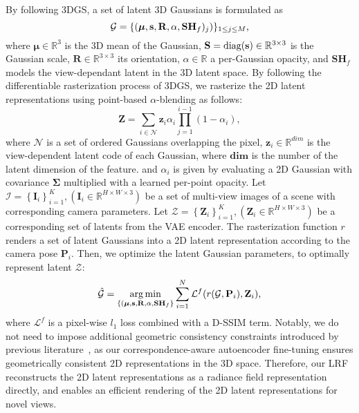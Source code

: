 By following 3DGS, a set of latent 3D Gaussians is formulated as
\begin{equation}
    \mathcal{G} = \{(\bm{\mu}, \mathbf{s}, \mathbf{R}, \alpha, \mathbf{SH}_{f})_j)\}_{1\leq j \leq M} \textnormal{,}
\end{equation}
where $\bm{\mu} \in \mathbb{R}^3$ is the 3D mean of the Gaussian, $\mathbf{S} = \textnormal{diag}(\mathbf{s}) \in \mathbb{R}^{3\times 3}$ is the Gaussian scale, $\mathbf{R}\in \mathbb{R}^{3\times 3}$ its orientation, $\alpha \in \mathbb{R}$ a per-Gaussian opacity, and $\mathbf{SH}_{f}$ models the view-dependant latent in the 3D latent space. By following the differentiable rasterization process of 3DGS, we rasterize the 2D latent representations using point-based $\alpha$-blending as follows:
\begin{equation}
\mathbf{Z} = \sum_{i\in \mathcal{N}}\mathbf{z}_{i}\alpha _{i}\prod_{j=1}^{i-1}(1-\alpha _{i}),
\end{equation}
where $\mathcal{N}$ is a set of ordered Gaussians overlapping the pixel, $\mathbf{z}_{i}\in \mathbb{R}^{dim}$
is the view-dependent latent code of each Gaussian, where $\mathbf{dim}$ is the number of the latent dimension of the feature. and $\alpha _{i}$ is given by evaluating a
2D Gaussian with covariance $\mathbf{\Sigma}$ multiplied with a
learned per-point opacity. 
Let  $\mathcal{I}=\left\{\boldsymbol{I}_i\right\}_{i=1}^K,\left(\boldsymbol{I}_i \in \mathbb{R}^{H \times W \times 3}\right)$ be a set of multi-view images of a scene with corresponding camera parameters. Let $\mathcal{Z}=\left\{\boldsymbol{Z}_i\right\}_{i=1}^K,\left(\boldsymbol{Z}_i \in \mathbb{R}^{H \times W \times 3}\right)$ be a corresponding set of latents from the VAE encoder. The rasterization function $r$ renders a set of latent Gaussians into a 2D latent representation according to the camera pose $\mathbf{P}_{i}$. Then, we optimize the latent Gaussian parameters, to optimally represent
latent $\mathcal{Z}$:
\begin{equation}
    \hat{\mathcal{G}} = \operatorname*{arg\,min}_{\{(\bm{\mu}, \mathbf{s}, \mathbf{R}, \alpha, \mathbf{SH}_{f}\}} \sum_{i=1}^N \mathcal{L}^f(r(\mathcal{G}, \mathbf{P}_{i}),\mathbf{Z}_i) \textnormal{,}
\end{equation}
where $\mathcal{L}^f$ is a pixel-wise $l_{1}$ loss combined with a D-SSIM term. Notably, we do not need to impose additional geometric consistency constraints introduced by previous literature~\citep{yue2024improving,kobayashi2022distilledfeaturefields,zhou2024feature}, as our correspondence-aware autoencoder fine-tuning ensures geometrically consistent 2D representations in the 3D space. Therefore, our LRF reconstructs the 2D latent representations as a radiance field representation directly, and enables an efficient rendering of the 2D latent representations for novel views.

